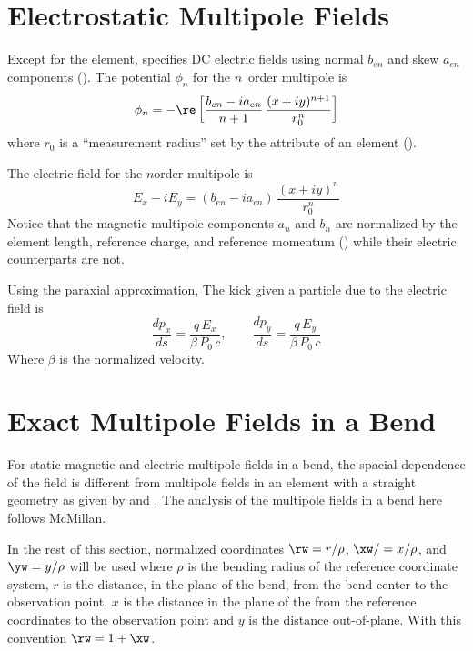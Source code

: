 \section{Electrostatic Multipole Fields}
\label{s:elec.field}

Except for the  element, \bmad specifies DC electric fields using normal
$b_{en}$ and skew $a_{en}$ components (). The potential $\phi_n$ for the
$n$\Th\ order multipole is
\begin{equation}
  \phi_n = -\re \left[ \frac{b_{en} - i a_{en}}{n + 1} \, \frac{(x + i y)^{n+1}}{r_0^n} \right]
  \label{pbian1}
\end{equation}
where $r_0$ is a ``measurement radius'' set by the  attribute of an element
().

The electric field for the $n$\Th order multipole is
\begin{equation}
  E_x - i E_y = (b_{en} - i a_{en}) \, \frac{(x + i y)^n}{r_0^n}
  \label{exiey}
\end{equation}
Notice that the magnetic multipole components $a_n$ and $b_n$ are normalized by the
element length, reference charge, and reference momentum () while their electric
counterparts are not.

Using the paraxial approximation, The kick given a particle due to the electric field is
\begin{equation}
  \frac{dp_x}{ds} = \frac{q \, E_x}{\beta \, P_0 \, c}, \qquad \frac{dp_y}{ds} = \frac{q \, E_y}{\beta \, P_0 \, c}
\end{equation}
Where $\beta$ is the normalized velocity.

\section{Exact Multipole Fields in a Bend}
\label{s:field.exact}

For static magnetic and electric multipole fields in a bend, the spacial dependence of the
field is different from multipole fields in an element with a straight geometry as given
by  and . The analysis of the multipole fields in a bend here follows
McMillan\cite{b:mcmillan}.  

In the rest of this section, normalized coordinates $\rw = r / \rho$, $\xw / = x /
\rho$, and $\yw = y / \rho$ will be used where $\rho$ is the bending radius of the
reference coordinate system, $r$ is the distance, in the plane of the bend, from the bend
center to the observation point, $x$ is the distance in the plane of the from the reference
coordinates to the observation point and $y$ is the distance out-of-plane. With this
convention $\rw = 1 + \xw$.

